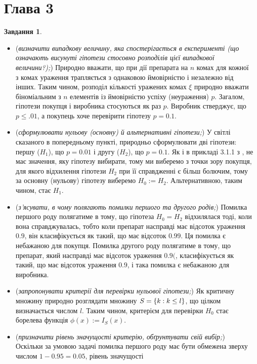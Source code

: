 \documentclass[12pt]{article} %
\newtheorem{prob}{Завдання}
\begin{document}
\section{Глава 3}
\setcounter{prob}{20}
\begin{prob}\end{prob}
	\begin{itemize}
		\item (\textit{визначити випадкову величину, яка спостерігається в експерименті (що означають висунуті гіпотези стосовно
			розподілів цієї випадкової величини?);})
			Природно вважати, що при дії препарата на $n$ комах для кожної з комах ураження трапляється з однаковою ймовірністю
			і незалежно від інших. Таким чином, розподіл кількості уражених комах $\xi$ природно вважати біноміальним з $n$ елементів
			із ймовірністю успіху (неураження) $p$. Загалом, гіпотези покупця і виробника стосуються як раз $p$. Виробник стверджує, що
			$p\leq.01$, а покупець хоче перевірити гіпотезу $p=0.1$.
		\item (\textit{сформулювати нульову (основну) й альтернативні гіпотези;}) У світлі сказаного в попередньому пункті, природньо
			сформулювати дві гіпотези: першу ($H_1$), що $p=0.01$ і другу ($H_2$), що $p=0.1$. Як і в прикладі 3.1.1 з \cite{turchin},
			не має значення, яку гіпотезу вибирати, тому ми виберемо з точки зору покупця, для якого відхилення гіпотези $H_2$ при
			її справдженні є більш болючим, тому за основну (нульову) гіпотезу виберемо $H_0:=H_2$. Альтернативною, таким чином, стає 
			$H_1$.
		\item (\textit{з’ясувати, в чому полягають помилки першого та другого родів;})
			Помилка першого роду полягатиме в тому, що гіпотеза $H_0=H_2$ відхилялася тоді, коли вона справджувалась, тобто
			коли препарат насправді має відсоток ураження $0.9$, він класифікується як такий, що має відсоток $0.99$. Ця помилка
			є небажаною для покупця. Помилка другого роду полягатиме в тому, що препарат, який насправді має відсоток ураження $0.9($,
			класифікується як такий, що має відсоток ураження $0.9$, і така помилка є небажаною для виробника.
		\item (\textit{запропонувати критерії для перевірки нульової гіпотези;})
			Як критичну множину природно розглядати множину $S=\left\{k:k\leq l\right\}$, що цілком визначається числом $l$. Таким
			чином, критерієм для перевірки $H_0$ стає борелева функція $\phi(x):=I_S(x)$.
		\item (\textit{призначити рівень значущості критерію, обґрунтувати свій вибір;})
			Оскільки за умовою задачі помилка першого роду має бути обмежена зверху числом $1-0.95=0.05$, рівень значущості

\end{itemize}
\end{document}

